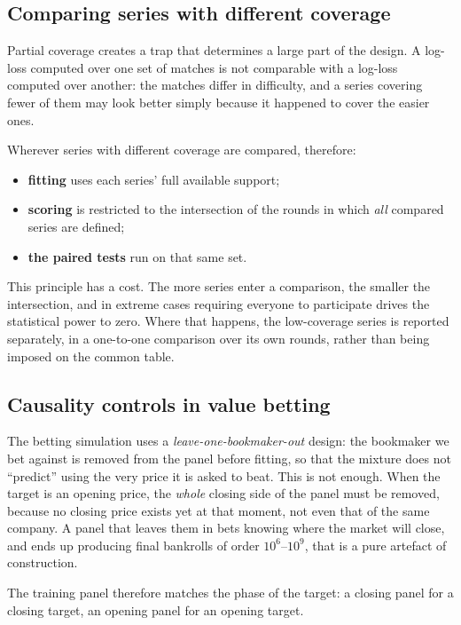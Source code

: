 \documentclass[12pt,a4paper,oneside]{report}
\renewcommand{\_}{\oldunderscore\allowbreak}
\theoremstyle{definition}
\theoremstyle{plain}
\theoremstyle{remark}
\begin{document}
\subsection{Comparing series with different coverage}
\label{sec:common-rounds}

Partial coverage creates a trap that determines a large part of the design. A log-loss computed
over one set of matches is not comparable with a log-loss computed over another: the matches
differ in difficulty, and a series covering fewer of them may look better simply because it
happened to cover the easier ones.

Wherever series with different coverage are compared, therefore:

\begin{itemize}
  \item \textbf{fitting} uses each series' full available support;
  \item \textbf{scoring} is restricted to the intersection of the rounds in which \emph{all}
        compared series are defined;
  \item \textbf{the paired tests} run on that same set.
\end{itemize}

This principle has a cost. The more series enter a comparison, the smaller the intersection, and
in extreme cases requiring everyone to participate drives the statistical power to zero. Where
that happens, the low-coverage series is reported separately, in a one-to-one comparison over its
own rounds, rather than being imposed on the common table.

\subsection{Causality controls in value betting}

The betting simulation uses a \emph{leave-one-bookmaker-out} design: the bookmaker we bet against
is removed from the panel before fitting, so that the mixture does not ``predict'' using the very
price it is asked to beat. This is not enough. When the target is an opening price, the
\emph{whole} closing side of the panel must be removed, because no closing price exists yet at
that moment, not even that of the same company. A panel that leaves them in bets knowing where
the market will close, and ends up producing final bankrolls of order $10^6$--$10^9$, that is a
pure artefact of construction.

The training panel therefore matches the phase of the target: a closing panel for a closing
target, an opening panel for an opening target.
\end{document}
